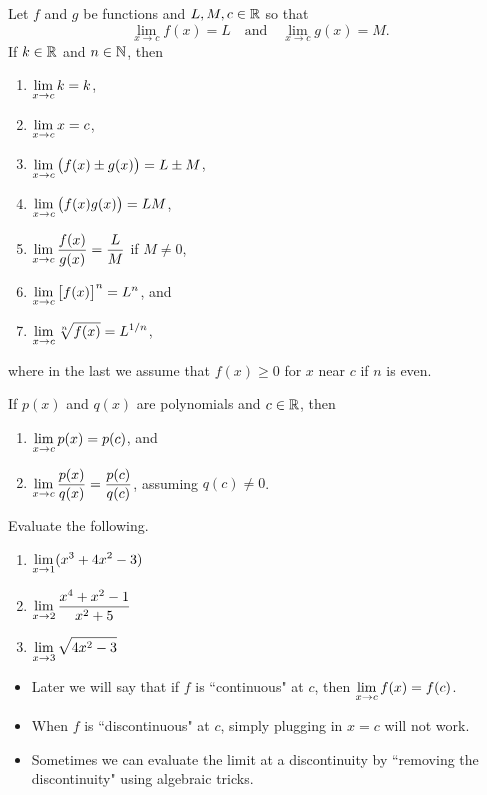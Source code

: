 \newpage

\begin{theorem}
Let $f$ and $g$ be functions and $L,M,c\in\mathbb R$ so that
\begin{equation*}
\lim_{x\to c}f(x) = L\quad \text{and}\quad \lim_{x\to c}g(x) = M.
\end{equation*}
If $k\in\mathbb R$ and $n\in\mathbb N$, then
\begin{enumerate}
\item $\displaystyle\lim_{x\to c}k = k$,
\item $\displaystyle\lim_{x\to c}x = c$,
\item $\displaystyle\lim_{x\to c}\big(f(x) \pm g(x)\big) = L\pm M$,
\item $\displaystyle\lim_{x\to c}\big(f(x)g(x)\big) = L M$,
\item $\displaystyle\lim_{x\to c}\frac{f(x)}{g(x)} = \frac{L}{M}$ if $M\ne 0$,
\item $\displaystyle\lim_{x\to c}\big[f(x)\big]^n = L^n$, and
\item $\displaystyle\lim_{x\to c}\sqrt[n]{f(x)} = L^{1/n}$,
\end{enumerate}
where in the last we assume that $f(x)\ge 0$ for $x$ near $c$ if $n$ is even.
\end{theorem}

\vfill

\begin{corollary}
If $p(x)$ and $q(x)$ are polynomials and $c\in\mathbb R$, then
\begin{enumerate}
\item $\displaystyle\lim_{x\to c}p(x) = p(c)$, and
\item $\displaystyle\lim_{x\to c}\frac{p(x)}{q(x)} = \frac{p(c)}{q(c)}$, assuming $q(c)\ne 0$.
\end{enumerate}
\end{corollary}
\vfill


\begin{example}
Evaluate the following.
\begin{enumerate}
\item $\displaystyle\lim_{x\to 1}(x^3+4x^2-3)$
\vfill
\item $\displaystyle\lim_{x\to 2}\frac{x^4+x^2-1}{x^2+5}$
\vfill
\item $\displaystyle\lim_{x\to 3}\sqrt{4x^2-3}$
\vfill
\end{enumerate}
\end{example}

\newpage

\begin{itemize}
\item Later we will say that if $f$ is ``continuous" at $c$, then $\displaystyle\lim_{x\to c}f(x) = f(c)$.
\item When $f$ is ``discontinuous" at $c$, simply plugging in $x=c$ will not work.
\item Sometimes we can evaluate the limit at a discontinuity by ``removing the discontinuity" using algebraic tricks.
\end{itemize}

